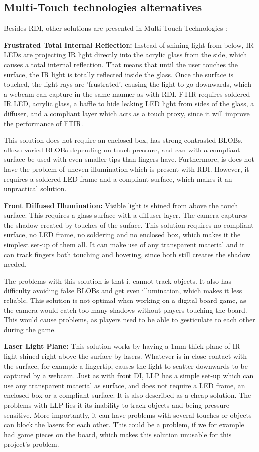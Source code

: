 \subsection{Multi-Touch technologies alternatives}\label{technologiesAlternatives}
Besides RDI, other solutions are presented in Multi-Touch Technologies \citep{multiTT}:

\textbf{Frustrated Total Internal Reflection:} Instead of shining light from below, IR LEDs are projecting IR light directly into the acrylic glass from the side, which causes a total internal reflection. That means that until the user touches the surface, the IR light is totally reflected inside the glass. Once the surface is touched, the light rays are 'frustrated', causing the light to go downwards, which a webcam can capture in the same manner as with RDI. FTIR requires soldered IR LED, acrylic glass, a baffle to hide leaking LED light from sides of the glass, a diffuser, and a compliant layer which acts as a touch proxy, since it will improve the performance of FTIR.

This solution does not require an enclosed box, has strong contrasted BLOBs, allows varied BLOBs depending on touch pressure, and can with a compliant surface be used with even smaller tips than fingers have. Furthermore, is does not have the problem of uneven illumination which is present with RDI. However, it requires a soldered LED frame and a compliant surface, which makes it an unpractical solution.

\textbf{Front Diffused Illumination:} Visible light is shined from above the touch surface. This requires a glass surface with a diffuser layer. The camera captures the shadow created by touches of the surface. This solution requires no compliant surface, no LED frame, no soldering and no enclosed box, which makes it the simplest set-up of them all. It can make use of any transparent material and it can track fingers both touching and hovering, since both still creates the shadow needed.

The problems with this solution is that  it cannot track objects. It also has difficulty avoiding false BLOBs and get even illumination, which makes it less reliable. This solution is not optimal when working on a digital board game, as the camera would catch too many shadows without players touching the board. This would cause problems, as players need to be able to gesticulate to each other during the game.

\textbf{Laser Light Plane:} This solution works by having a 1mm thick plane of IR light shined right above the surface by lasers. Whatever is in close contact with the surface, for example a fingertip, causes the light to scatter downwards to be captured by a webcam. Just as with front DI, LLP has a simple set-up which can use any transparent material as surface, and does not require a LED frame, an enclosed box or a compliant surface. It is also described as a cheap solution. The problems with LLP lies it its inability to track objects and being pressure sensitive. More importantly, it can have problems with several touches or objects can block the lasers for each other. This could be a problem, if we for example had game pieces on the board, which makes this solution unusable for this project's problem. 

